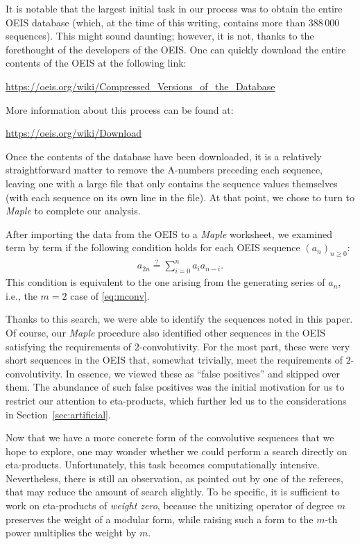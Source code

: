\documentclass[12pt,reqno]{amsart}
\numberwithin{equation}{section}
\theoremstyle{plain}
\theoremstyle{definition}
\theoremstyle{named}
\begin{document}
It is notable that the largest initial task in our process was to obtain the entire OEIS database (which, at the time of this writing, contains more than $388\,000$ sequences).  This might sound daunting; however, it is not, thanks to the forethought of the developers of the OEIS.  One can quickly download the entire contents of the OEIS at the following link:
\begin{center}
	\url{https://oeis.org/wiki/Compressed_Versions_of_the_Database}
\end{center}
More information about this process can be found at:
\begin{center}
	\url{https://oeis.org/wiki/Download}
\end{center}

Once the contents of the database have been downloaded, it is a relatively straightforward matter to remove the A-numbers preceding each sequence, leaving one with a large file that only contains the sequence values themselves (with each sequence on its own line in the file). At that point, we chose to turn to \textit{Maple} to complete our analysis.  

After importing the data from the OEIS to a \textit{Maple} worksheet, we examined term by term if the following condition holds for each OEIS sequence $(a_n)_{n\ge 0}$:
\begin{align*}
	a_{2n} \overset{?}{=} \sum_{i=0}^n a_ia_{n-i}.
\end{align*}
This condition is equivalent to the one arising from the generating series of $a_n$, i.e., the $m=2$ case of \eqref{eq:mconv}.

Thanks to this search, we were able to identify the sequences noted in this paper. Of course, our \emph{Maple} procedure also identified other sequences in the OEIS satisfying the requirements of $2$-convolutivity.  For the most part, these were very short sequences in the OEIS that, somewhat trivially, meet the requirements of $2$-convolutivity.  In essence, we viewed these as ``false positives'' and skipped over them. The abundance of such false positives was the initial motivation for us to restrict our attention to eta-products, which further led us to the considerations in Section~\ref{sec:artificial}.

Now that we have a more concrete form of the convolutive sequences that we hope to explore, one may wonder whether we could perform a search directly on eta-products. Unfortunately, this task becomes computationally intensive. Nevertheless, there is still an observation, as pointed out by one of the referees, that may reduce the amount of search slightly. To be specific, it is sufficient to work on eta-products of \emph{weight zero}, because the unitizing operator of degree $m$ preserves the weight of a modular form, while raising such a form to the $m$-th power multiplies the weight by $m$.
\end{document}
